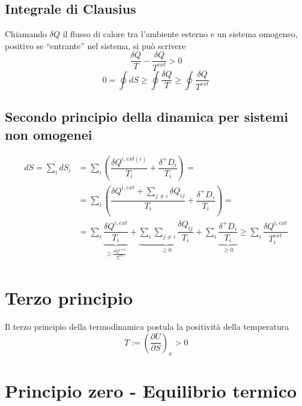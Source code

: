 \subsection{Integrale di Clausius}
Chiamando $\delta Q$ il flusso di calore tra l'ambiente esterno e un sistema omogeneo, positivo se ``entrante'' nel sistema,
si può scrivere
\begin{equation}
    \dfrac{\delta Q}{T} - \dfrac{\delta Q}{T^{ext}} > 0
\end{equation}
\begin{equation}
    0 = \oint dS \ge \oint \dfrac{\delta Q}{T} \ge \oint \dfrac{\delta Q}{T^{ext}} 
\end{equation}

\subsection{Secondo principio della dinamica per sistemi non omogenei}

\begin{equation}
\begin{aligned}
    dS = \sum_i dS_i
    & = \sum_i \left( \dfrac{\delta Q^{i,ext(i)}}{T_i} + \dfrac{\delta^+ D_i}{T_i} \right) = \\
    & = \sum_i \left( \dfrac{\delta Q^{i,ext} + \sum_{j \ne i} \delta Q_{ij}}{T_i} + \dfrac{\delta^+ D_i}{T_i} \right) = \\
    & = \sum_i \underbrace{ \dfrac{\delta Q^{i,ext}}{T_i} }_{\ge \frac{\delta Q^{i,ext}}{T_i^{ext}}} +  \underbrace{ \sum_i \sum_{j \ne i} \dfrac{\delta Q_{ij}}{T_i} }_{\ge 0} + \sum_i \underbrace{ \dfrac{\delta^+ D_i}{T_i}}_{\ge 0} \ge \sum_i \dfrac{\delta Q^{i,ext}}{T_i^{ext}}
\end{aligned}
\end{equation}


\section{Terzo principio}
Il terzo principio della termodinamica postula la positività della temperatura
\begin{equation}
  T := \left(\dfrac{\partial U}{\partial S}\right)_x > 0
\end{equation}

\section{Principio zero - Equilibrio termico}

